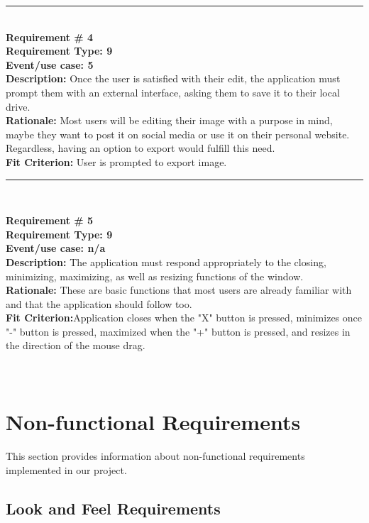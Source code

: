 \documentclass[12pt, titlepage]{article}
\begin{document}
	\noindent\rule{12cm}{0.4pt} \\

	\noindent\textbf{Requirement \# 4}\\
	\textbf{Requirement Type: 9}\\
	\textbf{Event/use case: 5}\\
	\textbf{Description:} Once the user is satisfied with their edit, the application must prompt them with an external interface, asking them to save it to their local drive. \\
	\textbf{Rationale:}  Most users will be editing their image with a purpose in mind, maybe they want to post it on social media or use it on their personal website. Regardless, having an option to export would fulfill this need.\\
	\textbf{Fit Criterion:} User is prompted to export image.\\

	\noindent\rule{12cm}{0.4pt} \\
	
	\newpage

	\noindent\textbf{Requirement \# 5}\\
	\textbf{Requirement Type: 9}\\
	\textbf{Event/use case: n/a}\\
	\textbf{Description:} The application must respond appropriately to the closing, minimizing, maximizing, as well as resizing functions of the window.\\
	\textbf{Rationale:} These are basic functions that most users are already familiar with and that the application should follow too.\\
	\textbf{Fit Criterion:}Application closes when the "X" button is pressed, minimizes once "-" button is pressed, maximized when the "+" button is pressed, and resizes in the direction of the mouse drag.\\ \\ \\

\newpage

\section{Non-functional Requirements}
This section provides information about non-functional requirements implemented in our project.

\subsection{Look and Feel Requirements}
\end{document}
